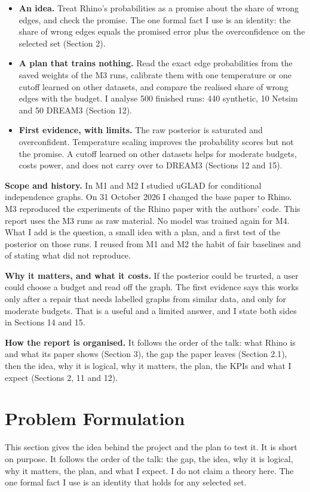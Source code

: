\documentclass[10pt]{article}
\begin{document}
\begin{itemize}
\item \textbf{An idea.} Treat Rhino's probabilities as a promise about the share of wrong edges, and check the promise. The one formal fact I use is an identity: the share of wrong edges equals the promised error plus the overconfidence on the selected set (Section 2).
\item \textbf{A plan that trains nothing.} Read the exact edge probabilities from the saved weights of the M3 runs, calibrate them with one temperature or one cutoff learned on other datasets, and compare the realised share of wrong edges with the budget. I analyse 500 finished runs: 440 synthetic, 10 Netsim and 50 DREAM3 (Section 12).
\item \textbf{First evidence, with limits.} The raw posterior is saturated and overconfident. Temperature scaling improves the probability scores but not the promise. A cutoff learned on other datasets helps for moderate budgets, costs power, and does not carry over to DREAM3 (Sections 12 and 15).
\end{itemize}
\textbf{Scope and history.} In M1 and M2 I studied uGLAD for conditional independence graphs. On 31 October 2026 I changed the base paper to Rhino. M3 reproduced the experiments of the Rhino paper with the authors' code. This report uses the M3 runs as raw material. No model was trained again for M4. What I add is the question, a small idea with a plan, and a first test of the posterior on those runs. I reused from M1 and M2 the habit of fair baselines and of stating what did not reproduce.

\textbf{Why it matters, and what it costs.} If the posterior could be trusted, a user could choose a budget and read off the graph. The first evidence says this works only after a repair that needs labelled graphs from similar data, and only for moderate budgets. That is a useful and a limited answer, and I state both sides in Sections 14 and 15.

\textbf{How the report is organised.} It follows the order of the talk: what Rhino is and what its paper shows (Section 3), the gap the paper leaves (Section 2.1), then the idea, why it is logical, why it matters, the plan, the KPIs and what I expect (Sections 2, 11 and 12).

\section{Problem Formulation}
This section gives the idea behind the project and the plan to test it. It is short on purpose. It follows the order of the talk: the gap, the idea, why it is logical, why it matters, the plan, and what I expect. I do not claim a theory here. The one formal fact I use is an identity that holds for any selected set.
\end{document}
